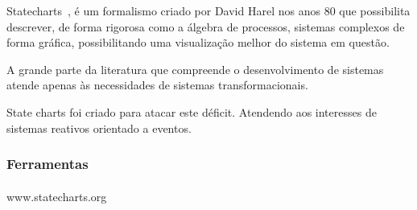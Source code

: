 Statecharts~\cite{Harel:1987:SVF:34884.34886}, é um formalismo criado por
David Harel nos anos 80 que possibilita descrever, de forma rigorosa como a
álgebra de processos, sistemas complexos de forma gráfica, possibilitando uma
visualização melhor do sistema em questão.

A grande parte da literatura que compreende o desenvolvimento
de sistemas atende apenas às necessidades de sistemas transformacionais.

State charts foi criado para atacar este déficit. Atendendo aos interesses 
de  sistemas reativos orientado a eventos.

\subsubsection{Ferramentas}
\paragraph{}
www.statecharts.org

